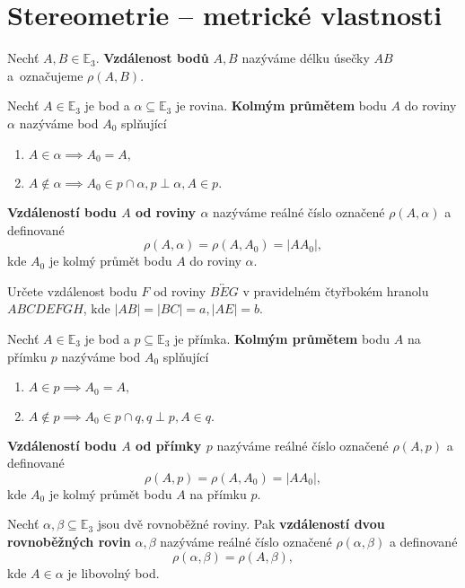 \section{Stereometrie -- metrické vlastnosti}
\begin{definition}
    Nechť $A, B \in \mathbb E_3.$ \textbf{Vzdálenost bodů} $A,B$ nazýváme délku
    úsečky $AB$ a~označujeme $\rho(A,B).$
\end{definition}

\begin{definition}
    Nechť $A\in \mathbb E_3$ je bod a $\alpha \subseteq \mathbb E_3$ je rovina.
    \textbf{Kolmým průmětem} bodu $A$ do roviny $\alpha$ nazýváme bod $A_0$
    splňující
    \begin{enumerate}[$i.$]
    \item $A\in \alpha \implies A_0=A,$
   	\item $A\notin \alpha \implies A_0 \in p\cap \alpha, p \perp\alpha, A \in p.$
    \end{enumerate}
    \textbf{Vzdáleností bodu $A$ od roviny $\alpha$} nazýváme reálné číslo označené
    $\rho(A,\alpha) $ a definované
    $$\rho(A,\alpha) = \rho(A, A_0) = |AA_0|,$$
    kde $A_0$ je kolmý průmět bodu $A$ do roviny $\alpha.$
\end{definition}

\begin{priklad}
Určete vzdálenost bodu $F$ od roviny $\overleftrightarrow{BEG}$ v pravidelném
čtyřbokém hranolu $ABCDEFGH$, kde $|AB|=|BC|=a, |AE|=b$.
\end{priklad}

\begin{definition}
    Nechť $A\in \mathbb E_3$ je bod a $p \subseteq \mathbb E_3$ je přímka.
    \textbf{Kolmým průmětem} bodu $A$ na přímku $p$ nazýváme bod $A_0$
    splňující
    \begin{enumerate}[$i.$]
    \item $A\in p \implies A_0=A,$
    \item $A\notin p \implies A_0 \in p \cap q, q \perp p, A \in q.$
    \end{enumerate}
    \textbf{Vzdáleností bodu $A$ od přímky $p$} nazýváme reálné číslo označené
    $\rho(A,p) $ a definované
    $$\rho(A,p) = \rho(A, A_0) = |AA_0|,$$
    kde $A_0$ je kolmý průmět bodu $A$ na přímku $p.$
\end{definition}

\begin{definition}
    Nechť $\alpha, \beta \subseteq \mathbb E_3$ jsou dvě rovnoběžné roviny. Pak
    \textbf{vzdáleností dvou rovnoběžných rovin} $\alpha, \beta$ nazýváme reálné
    číslo označené $\rho(\alpha, \beta)$ a definované
    $$\rho(\alpha, \beta)=\rho(A,\beta),$$
    kde $A\in\alpha$ je libovolný bod.
\end{definition}

